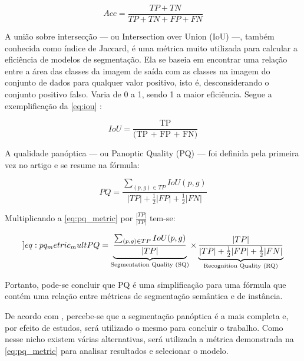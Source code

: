 \begin{equation}
    \label{eq:acc}
    Acc = \frac{TP + TN}{TP + TN + FP + FN}
\end{equation}


A união sobre intersecção — ou Intersection over Union (IoU) —, também conhecida como índice de Jaccard, é uma métrica muito utilizada para calcular a eficiência de modelos de segmentação. Ela se baseia em encontrar uma relação entre a área das classes da imagem de saída com as classes na imagem do conjunto de dados para qualquer valor positivo, isto é, desconsiderando o conjunto positivo falso. Varia de 0 a 1, sendo 1 a maior eficiência. Segue a exemplificação da \cref{eq:iou} \space\cite{iou_metric_link}:

\begin{equation}
    \label{eq:iou}
    IoU = \frac{\text{TP}}{\text{(TP + FP + FN)}}
\end{equation}


A qualidade panóptica — ou Panoptic Quality (PQ) — foi definida pela primeira vez no artigo  e se resume na fórmula:

\begin{equation}
    \label{eq:pq_metric}
    PQ = \frac{\sum_{(p,g)\in TP}IoU(p,g)}{|TP| + \frac{1}{2}|FP| + \frac{1}{2}|FN|}
\end{equation}

Multiplicando a \cref{eq:pq_metric} por $\frac{|TP|}{|TP|}$ tem-se:

\begin{equation}
    \label[]{eq:pq_metric_mult}
    PQ = \underbrace{\frac{\sum_{(p,g)\in TP}IoU(p,g)}{|TP|}}_{\text{Segmentation Quality (SQ)}}
    \times
    \underbrace{\frac{|TP|}{|TP| + \frac{1}{2}|FP| + \frac{1}{2}|FN|}}_{\text{Recognition Quality (RQ)}}
\end{equation}

Portanto, pode-se concluir que PQ é uma simplificação para uma fórmula que contém uma relação entre métricas de segmentação semântica e de instância.

De acordo com , percebe-se que a segmentação panóptica é a mais completa e, por efeito de estudos, será utilizado o mesmo para concluir o trabalho. Como nesse nicho existem várias alternativas, será utilizada a métrica demonstrada na \cref{eq:pq_metric} para analisar resultados e selecionar o modelo.

